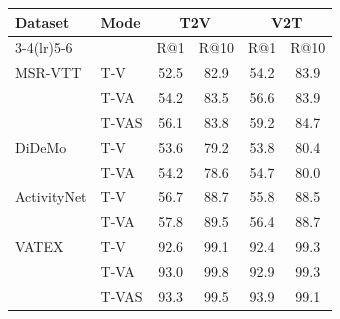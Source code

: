 \begin{tabular}{llcccc}
\toprule
\multirow{2}{*}{Dataset} & \multirow{2}{*}{Mode} & \multicolumn{2}{c}{T2V} & \multicolumn{2}{c}{V2T} \\
\cmidrule(lr){3-4}\cmidrule(lr){5-6}
 & & R@1 & R@10 & R@1 & R@10 \\
\midrule
MSR-VTT & T-V & 52.5 & 82.9 & 54.2 & 83.9 \\
 & T-VA & 54.2 & 83.5 & 56.6 & 83.9 \\
 & T-VAS & 56.1 & 83.8 & 59.2 & 84.7 \\
\midrule
DiDeMo & T-V & 53.6 & 79.2 & 53.8 & 80.4 \\
 & T-VA & 54.2 & 78.6 & 54.7 & 80.0 \\
\midrule
ActivityNet & T-V & 56.7 & 88.7 & 55.8 & 88.5 \\
 & T-VA & 57.8 & 89.5 & 56.4 & 88.7 \\
\midrule
VATEX & T-V & 92.6 & 99.1 & 92.4 & 99.3 \\
 & T-VA & 93.0 & 99.8 & 92.9 & 99.3 \\
 & T-VAS & 93.3 & 99.5 & 93.9 & 99.1 \\
\bottomrule
\end{tabular}

